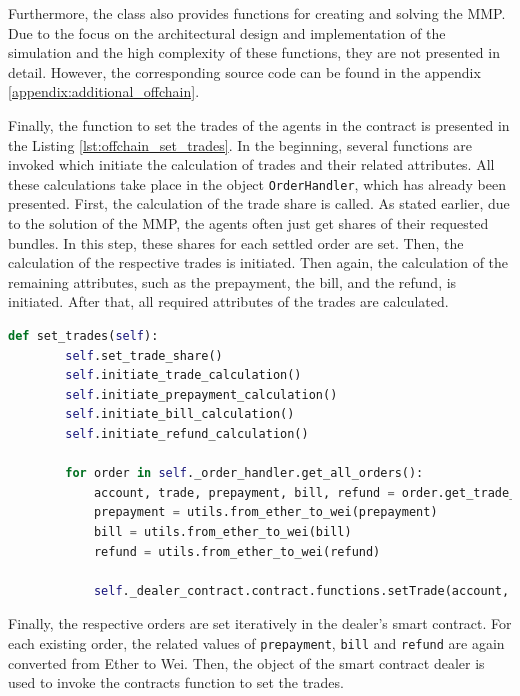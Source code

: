 Furthermore, the class also provides functions for creating and solving the MMP.
Due to the focus on the architectural design and implementation of the simulation and the high complexity
of these functions, they are not presented in detail. However, the corresponding source code can be found in the appendix \ref{appendix:additional_offchain}.

Finally, the function to set the trades of the agents in the contract is presented in the Listing \ref{lst:offchain_set_trades}.
In the beginning, several functions are invoked which initiate the calculation of trades and their related attributes.
All these calculations take place in the object \verb|OrderHandler|, which has already been presented.
First, the calculation of the trade share is called. As stated earlier, due to the solution of the 
MMP, the agents often just get shares of their requested bundles. In this step,
these shares for each settled order are set. Then, the calculation of the respective trades is initiated.
Then again, the calculation of the remaining attributes, such as the prepayment, the bill, and the refund,
is initiated. 
After that, all required attributes of the trades are calculated.


\begin{lstlisting}[float=htbp, label=lst:offchain_set_trades, caption=Submitment of trades, language=Python]
    def set_trades(self):
        self.set_trade_share()
        self.initiate_trade_calculation()
        self.initiate_prepayment_calculation()
        self.initiate_bill_calculation()
        self.initiate_refund_calculation()

        for order in self._order_handler.get_all_orders():
            account, trade, prepayment, bill, refund = order.get_trade_information()
            prepayment = utils.from_ether_to_wei(prepayment)
            bill = utils.from_ether_to_wei(bill)
            refund = utils.from_ether_to_wei(refund)

            self._dealer_contract.contract.functions.setTrade(account, trade, prepayment, bill, refund).transact({'from': self._account_address})
\end{lstlisting}

Finally, the respective orders are set iteratively in the dealer's smart contract. For each existing order, the related values of 
\verb|prepayment|, \verb|bill| and \verb|refund| are again converted from Ether to Wei. Then, the object of the smart 
contract dealer is used to invoke the contracts function to set the trades.


